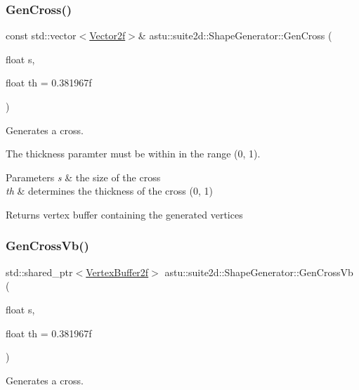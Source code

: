 \subsubsection{\texorpdfstring{Gen\+Cross()}{GenCross()}}
{\footnotesize\ttfamily const std\+::vector$<$\hyperlink{classastu_1_1Vector2}{Vector2f}$>$\& astu\+::suite2d\+::\+Shape\+Generator\+::\+Gen\+Cross (\begin{DoxyParamCaption}\item[{float}]{s,  }\item[{float}]{th = {\ttfamily 0.381967f} }\end{DoxyParamCaption})}

Generates a cross.

The thickness paramter must be within in the range (0, 1).


\begin{DoxyParams}{Parameters}
{\em s} & the size of the cross \\
\hline
{\em th} & determines the thickness of the cross (0, 1) \\
\hline
\end{DoxyParams}
\begin{DoxyReturn}{Returns}
vertex buffer containing the generated vertices 
\end{DoxyReturn}
\mbox{\label{classastu_1_1suite2d_1_1ShapeGenerator_ab390c2586ac298fd27a1095181427620}} 
\subsubsection{\texorpdfstring{Gen\+Cross\+Vb()}{GenCrossVb()}}
{\footnotesize\ttfamily std\+::shared\+\_\+ptr$<$\hyperlink{group__gfx__group_ga081cf45a441eef100dfbb1e0f64c3826}{Vertex\+Buffer2f}$>$ astu\+::suite2d\+::\+Shape\+Generator\+::\+Gen\+Cross\+Vb (\begin{DoxyParamCaption}\item[{float}]{s,  }\item[{float}]{th = {\ttfamily 0.381967f} }\end{DoxyParamCaption})\hspace{0.3cm}{\ttfamily [inline]}}

Generates a cross.

